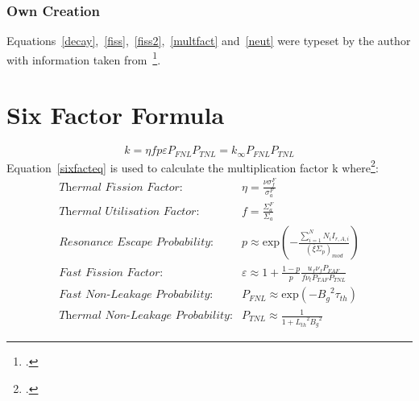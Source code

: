 \subsection{Own Creation}
Equations~\ref{decay},~\ref{fiss},~\ref{fiss2},~\ref{multfact} and~\ref{neut} were typeset by the author with
information taken from~\footcite{ReactorDesign}.

\chapter{Six Factor Formula}\label{app:sixfact}
\begin{equation}\label{sixfacteq}
    k = \eta f p \varepsilon P_{FNL} P_{TNL} = k_{\infty} P_{FNL} P_{TNL}
\end{equation}
Equation~\ref{sixfacteq} is used to calculate the multiplication factor k where\footcite{nucfundamentals}: \\
\begin{equation}
    \begin{split}
    \textit{Thermal Fission Factor}: & \eta = \frac{\nu \sigma_f^F}{\sigma_a^F} \\
    \textit{Thermal Utilisation Factor}: & f = \frac{\Sigma_a^F}{\Sigma_a} \\
    \textit{Resonance Escape Probability}: & p \approx \mathrm{exp} \left( -\frac{\sum\limits_{i=1}^{N} N_i I_{r,A,i}}{\left( \overline{\xi} \Sigma_p \right)_{mod}} \right) \\
    \textit{Fast Fission Factor}: & \varepsilon \approx 1 + \frac{1-p}{p}\frac{u_f \nu_f P_{FAF}}{f \nu_t P_{TAF} P_{TNL}} \\
    \textit{Fast Non-Leakage Probability}: & P_{FNL} \approx \mathrm{exp} \left( -{B_g}^2 \tau_{th} \right) \\
    \textit{Thermal Non-Leakage Probability}: & P_{TNL} \approx \frac{1}{1+{L_{th}}^2 {B_g}^2}
    \end{split}
\end{equation}